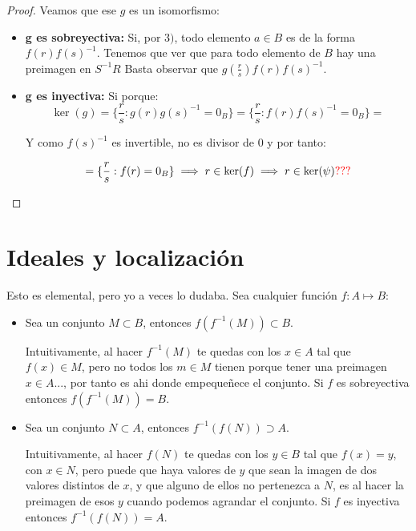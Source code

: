 	\begin{proof}

		Veamos que ese $g$ es un isomorfismo:
		\begin{itemize}
			\item \textbf{g es sobreyectiva:} Si, por $3)$, todo elemento $a \in B$ es de la forma $f(r)f(s)^{-1}$. Tenemos que ver que para todo elemento de $B$ hay una preimagen en $S^{-1}R$ Basta observar que $g\left( \frac{r}{s} \right) f(r)f(s)^{-1}$.
			\item \textbf{g es inyectiva:} Si porque:
			$$\ker(g) = \{ \frac{r}{s}: g(r)g(s)^{-1}=0_B \} = \{ \frac{r}{s}: f(r)f(s)^{-1}=0_B \} = $$

			Y como $f(s)^{-1}$ es invertible, no es divisor de 0 y por tanto:

			$$ = \{ \frac{r}{s}: f(r)=0_B \} \implies r \in \ker(f) \implies r \in \ker(\psi)\textcolor{red}{???}$$
		\end{itemize}
	\end{proof}

\section{Ideales y localización}

\nota Esto es elemental, pero yo a veces lo dudaba. Sea cualquier función $f: A \longmapsto B$:
\begin{itemize}
	\item Sea un conjunto $M \subset B$, entonces $f(f^{-1}(M)) \subset B$.

	Intuitivamente, al hacer $f^{-1}(M)$ te quedas con los $x \in A$ tal que $f(x) \in M$, pero no todos los $m \in M$ tienen porque tener una preimagen $x \in A$..., por tanto es ahi donde empequeñece el conjunto. Si $f$ es sobreyectiva entonces $f(f^{-1}(M))= B$.
	\item Sea un conjunto $N \subset A$, entonces $f^{-1}(f(N)) \supset A$.

	Intuitivamente, al hacer $f(N)$ te quedas con los $y \in B$ tal que $f(x)=y$, con $x\in N$, pero puede que haya valores de $y$ que sean la imagen de dos valores distintos de $x$, y que alguno de ellos no pertenezca a $N$, es al hacer la preimagen de esos $y$ cuando podemos agrandar el conjunto. Si $f$ es inyectiva entonces $f^{-1}(f(N)) =  A$.
\end{itemize}

